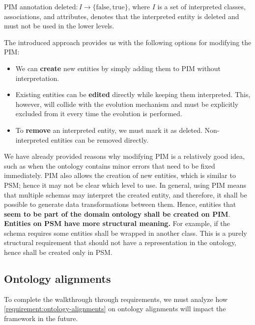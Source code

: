 \begin{definition}[deleted]
    PIM annotation $\textrm{deleted}: I \rightarrow \{\textrm{false}, \textrm{true}\}$, where $I$ is a set of interpreted classes, associations, and attributes, denotes that the interpreted entity is deleted and must not be used in the lower levels.
\end{definition}

\medskip

The introduced approach provides us with the following options for modifying the PIM:
\begin{itemize}
    \item We can \textbf{create} new entities by simply adding them to PIM without interpretation.
    \item Existing entities can be \textbf{edited} directly while keeping them interpreted. This, however, will collide with the evolution mechanism and must be explicitly excluded from it every time the evolution is performed.
    \item To \textbf{remove} an interpreted entity, we must mark it as deleted. Non-in\-ter\-pre\-ted entities can be removed directly.
\end{itemize}

We have already provided reasons why modifying PIM is a relatively good idea, such as when the ontology contains minor errors that need to be fixed immediately. PIM also allows the creation of new entities, which is similar to PSM; hence it may not be clear which level to use. In general, using PIM means that multiple schemas may interpret the created entity, and therefore, it shall be possible to generate data transformations between them. Hence, entities that \textbf{seem to be part of the domain ontology shall be created on PIM}. \textbf{Entities on PSM have more structural meaning.} For example, if the schema requires some entities shall be wrapped in another class. This is a purely structural requirement that should not have a representation in the ontology, hence shall be created only in PSM.

\subsection{Ontology alignments}\label{sec:ontology-alignments}

To complete the walkthrough through requirements, we must analyze how \autoref{requirement:ontology-alignments} on ontology alignments will impact the framework in the future.

